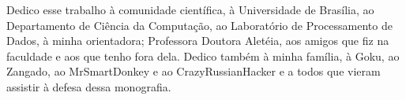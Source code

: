 Dedico esse trabalho à comunidade científica, à Universidade de Brasília, ao Departamento de Ciência da Computação, ao Laboratório de Processamento de Dados, à minha orientadora; Professora Doutora Aletéia, aos amigos que fiz na faculdade e aos que tenho fora dela. Dedico também à minha família, à Goku, ao Zangado, ao MrSmartDonkey e ao CrazyRussianHacker e a todos que vieram assistir à defesa dessa monografia.